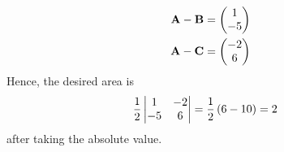 
\begin{align}
  \mathbf{A}-\mathbf{B} &= \begin{pmatrix}1\\-5\end{pmatrix}
  \\
  \mathbf{A}-\mathbf{C} &= \begin{pmatrix}-2\\6\end{pmatrix}
\end{align}
%
Hence, the desired area is 
\begin{align}
  \frac{1}{2} \begin{vmatrix}1 & -2\\-5 & 6 \end{vmatrix}
    &=\frac{1}{2}\left(6 -10\right) = 2
\end{align}
%
after taking the absolute value.
